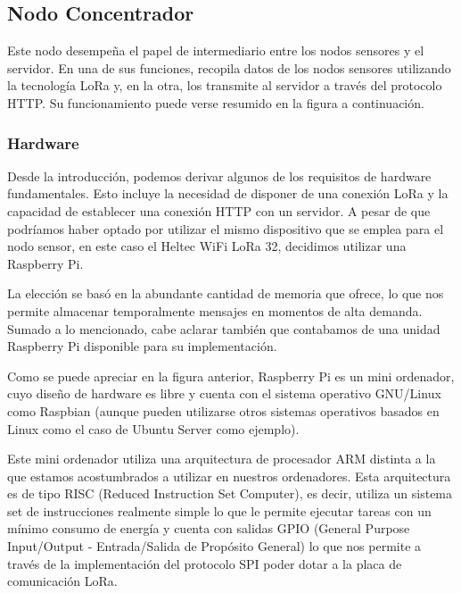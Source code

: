 \clearpage

\subsection{Nodo Concentrador}
Este nodo desempeña el papel de intermediario entre los nodos sensores y el servidor. En una de sus funciones, recopila datos de los nodos sensores utilizando la tecnología LoRa y, en la otra, los transmite al servidor a través del protocolo HTTP. Su funcionamiento puede verse resumido en la figura a continuación.


\subsubsection{Hardware}

Desde la introducción, podemos derivar algunos de los requisitos de hardware fundamentales. Esto incluye la necesidad de disponer de una conexión LoRa y la capacidad de establecer una conexión HTTP con un servidor. A pesar de que podríamos haber optado por utilizar el mismo dispositivo que se emplea para el nodo sensor, en este caso el Heltec WiFi LoRa 32, decidimos utilizar una Raspberry Pi.

La elección se basó en la abundante cantidad de memoria que ofrece, lo que nos permite almacenar temporalmente mensajes en momentos de alta demanda. Sumado a lo mencionado, cabe aclarar también que contabamos de una unidad Raspberry Pi disponible para su implementación.


Como se puede apreciar en la figura anterior, Raspberry Pi es un mini ordenador, cuyo diseño de hardware es libre y cuenta con el sistema operativo GNU/Linux como Raspbian (aunque pueden utilizarse otros sistemas operativos basados en Linux como el caso de Ubuntu Server como ejemplo). 


Este mini ordenador utiliza una arquitectura de procesador ARM distinta a la que estamos acostumbrados a utilizar en nuestros ordenadores. Esta arquitectura es de tipo RISC (Reduced Instruction Set Computer), es decir, utiliza un sistema set de instrucciones realmente simple lo que le permite ejecutar tareas con un mínimo consumo de energía y cuenta con salidas GPIO (General Purpose Input/Output - Entrada/Salida de Propósito General) lo que nos permite a través de la implementación del protocolo SPI poder dotar a la placa de comunicación LoRa.


